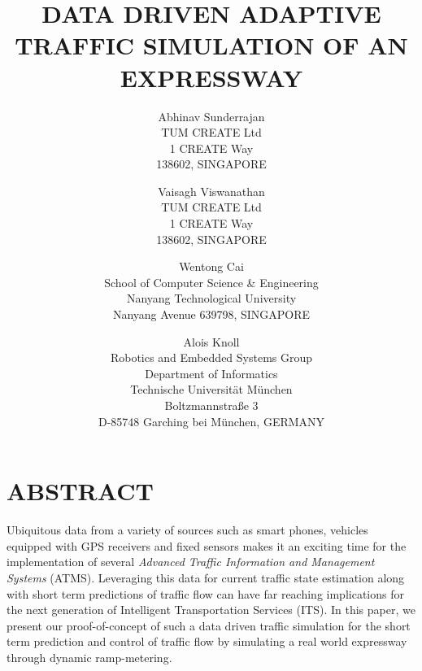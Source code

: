 \documentclass{wscpaperproc}
\theoremstyle{wsc}
\begin{document}
%
%

\title{DATA DRIVEN ADAPTIVE TRAFFIC SIMULATION OF AN EXPRESSWAY}

\author{Abhinav Sunderrajan\\ [12pt]
TUM CREATE Ltd \\
1 CREATE Way\\
138602, SINGAPORE\\
\and
Vaisagh Viswanathan\\[12pt]
TUM CREATE Ltd \\
1 CREATE Way\\
138602, SINGAPORE\\
\and
Wentong Cai\\ [12pt]
School of Computer Science \& Engineering\\
Nanyang Technological University\\
Nanyang Avenue 639798, SINGAPORE\\
\and
Alois Knoll\\ [12pt]
Robotics and Embedded Systems Group \\
Department of Informatics\\
Technische Universit\"at M\"unchen\\
Boltzmannstra{\ss}e 3\\
D-85748 Garching bei M\"unchen, GERMANY
}



\maketitle

\section*{ABSTRACT}
Ubiquitous data from a variety of sources such as smart phones, vehicles equipped with GPS receivers and fixed sensors makes it an exciting time for the implementation of several {\it Advanced Traffic Information and Management Systems} (ATMS). Leveraging this data for current traffic state estimation along with short term predictions of traffic flow can have far reaching implications for the next generation of Intelligent Transportation Services (ITS). In this paper, we present our proof-of-concept of such a data driven traffic simulation for the short term prediction and control of traffic flow by simulating a real world expressway through dynamic ramp-metering.
\end{document}
